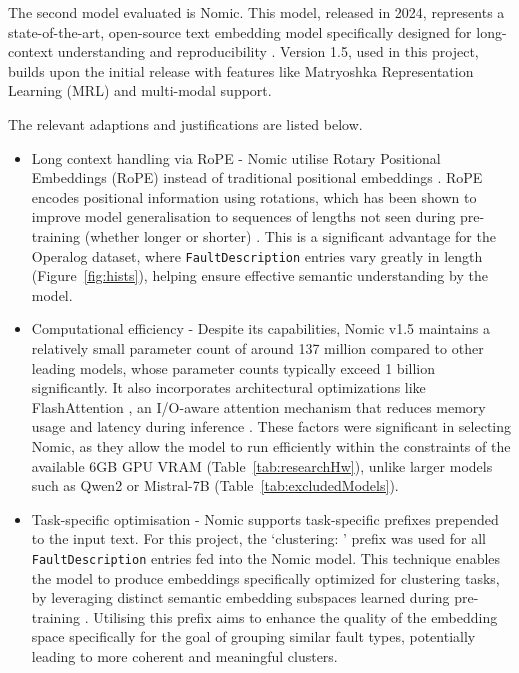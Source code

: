 \documentclass[10pt,oneside]{report}
\begin{document}
The second model evaluated is Nomic. This model, released in 2024, represents a state-of-the-art, open-source text embedding model specifically designed for long-context understanding and reproducibility \cite{nussbaum2024nomic, nussbaum2024nomic1.5}. Version 1.5, used in this project, builds upon the initial release with features like Matryoshka Representation Learning (MRL) and multi-modal support.


The relevant adaptions and justifications are listed below.
\begin{itemize}
    \item Long context handling via RoPE - Nomic utilise Rotary Positional Embeddings (RoPE) instead of traditional positional embeddings \cite{su2024roformer, nussbaum2024nomic, vaswani2017attention}. RoPE encodes positional information using rotations, which has been shown to improve model generalisation to sequences of lengths not seen during pre-training (whether longer or shorter) \cite{su2024roformer}. This is a significant advantage for the Operalog dataset, where \texttt{FaultDescription} entries vary greatly in length (Figure~\ref{fig:hists}), helping ensure effective semantic understanding by the model.
    \item Computational efficiency - Despite its capabilities, Nomic v1.5 maintains a relatively small parameter count of around 137 million compared to other leading models, whose parameter counts typically exceed 1 billion significantly. It also incorporates architectural optimizations like FlashAttention \cite{dao2022flashattention}, an I/O-aware attention mechanism that reduces memory usage and latency during inference \cite{nussbaum2024nomic}. These factors were significant in selecting Nomic, as they allow the model to run efficiently within the constraints of the available 6GB GPU VRAM (Table~\ref{tab:researchHw}), unlike larger models such as Qwen2 or Mistral-7B (Table~\ref{tab:excludedModels}).
    \item Task-specific optimisation - Nomic supports task-specific prefixes prepended to the input text. For this project, the `clustering: ' prefix was used for all \texttt{FaultDescription} entries fed into the Nomic model. This technique enables the model to produce embeddings specifically optimized for clustering tasks, by leveraging distinct semantic embedding subspaces learned during pre-training \cite{nussbaum2024nomic}. Utilising this prefix aims to enhance the quality of the embedding space specifically for the goal of grouping similar fault types, potentially leading to more coherent and meaningful clusters.

\end{itemize}
\end{document}
